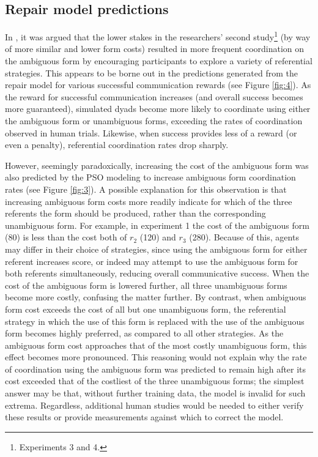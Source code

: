 \documentclass[12pt,a4paper]{article}
\begin{document}
\subsection{Repair model predictions}
In \citeauthor{rohde2012}, it was argued that the lower stakes in the researchers' second study\footnote{Experiments 3 and 4.} (by way of more similar and lower form costs) resulted in more frequent coordination on the ambiguous form by encouraging participants to explore a variety of referential strategies. This appears to be borne out in the predictions generated from the repair model for various successful communication rewards (see Figure \ref{fig:4}). As the reward for successful communication increases (and overall success becomes more guaranteed), simulated dyads become more likely to coordinate using either the ambiguous form or unambiguous forms, exceeding the rates of coordination observed in human trials. Likewise, when success provides less of a reward (or even a penalty), referential coordination rates drop sharply. 

However, seemingly paradoxically, increasing the cost of the ambiguous form was also predicted by the PSO modeling to increase ambiguous form coordination rates (see Figure \ref{fig:3}). A possible explanation for this observation is that increasing ambiguous form costs more readily indicate for which of the three referents the form should be produced, rather than the corresponding unambiguous form. For example, in experiment 1 the cost of the ambiguous form (80) is less than the cost both of $r_2$ (120) and $r_3$ (280). Because of this, agents may differ in their choice of strategies, since using the ambiguous form for either referent increases score, or indeed may attempt to use the ambiguous form for both referents simultaneously, reducing overall communicative success. When the cost of the ambiguous form is lowered further, all three unambiguous forms become more costly, confusing the matter further. By contrast, when ambiguous form cost exceeds the cost of all but one unambiguous form, the referential strategy in which the use of this form is replaced with the use of the ambiguous form becomes highly preferred, as compared to all other strategies. As the ambiguous form cost approaches that of the most costly unambiguous form, this effect becomes more pronounced. This reasoning would not explain why the rate of coordination using the ambiguous form was predicted to remain high after its cost exceeded that of the costliest of the three unambiguous forms; the simplest answer may be that, without further training data, the model is invalid for such extrema. Regardless, additional human studies would be needed to either verify these results or provide measurements against which to correct the model.
\end{document}
